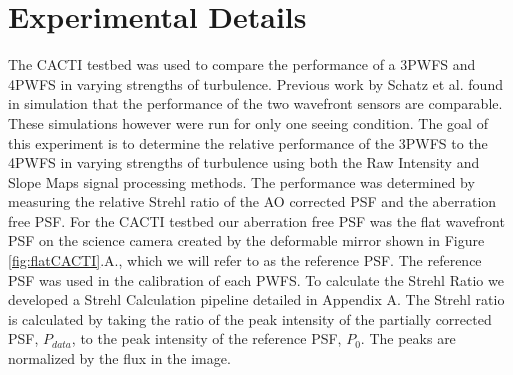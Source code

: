 				


\section{Experimental Details}


The CACTI testbed was used to compare the performance of a 3PWFS and 4PWFS in varying strengths of turbulence. Previous work by Schatz et al. found in simulation that the performance of the two wavefront sensors are comparable. These simulations however were run for only one seeing condition. The goal of this experiment is to determine the relative performance of the 3PWFS to the 4PWFS in varying strengths of turbulence using both the Raw Intensity and Slope Maps signal processing methods. The performance was determined by measuring the relative Strehl ratio of the AO corrected PSF and the aberration free PSF. For the CACTI testbed our aberration free PSF was the flat wavefront PSF on the science camera created by the deformable mirror shown in Figure \ref{fig:flatCACTI}.A., which we will refer to as the reference PSF. The reference PSF was used in the calibration of each PWFS. To calculate the Strehl Ratio we developed a Strehl Calculation pipeline detailed in Appendix A. The Strehl ratio is calculated by taking the ratio of the peak intensity of the partially corrected PSF, $P_{data}$,  to the peak intensity of the reference PSF, $P_0$. The peaks are normalized by the flux in the image. 

